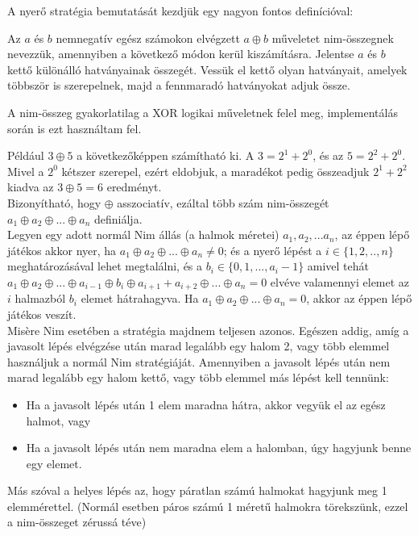A nyerő stratégia bemutatását kezdjük egy nagyon fontos definícióval:
\begin{definition}
	Az $a$ és $b$ nemnegatív egész számokon elvégzett $a \oplus b$ műveletet nim-összegnek nevezzük, amennyiben a következő módon kerül kiszámításra. Jelentse $a$ és $b$ kettő különálló hatványainak összegét. Vessük el kettő olyan hatványait, amelyek többször is szerepelnek, majd a fennmaradó hatványokat adjuk össze.
\end{definition}

\begin{remark}
	A nim-összeg gyakorlatilag a XOR logikai műveletnek felel meg, implementálás során is ezt használtam fel.
\end{remark}

Például $3 \oplus 5$ a következőképpen számítható ki. A $3 = 2^1 + 2^0$, és az $5 = 2^2 + 2^0$. Mivel a $2^0$ kétszer szerepel, ezért eldobjuk, a maradékot pedig  összeadjuk $2^1 + 2^2$ kiadva az $3 \oplus 5 = 6$ eredményt. \\

Bizonyítható, hogy $\oplus$ asszociatív, ezáltal több szám nim-összegét $a_1 \oplus a_2 \oplus ... \oplus a_n$ definiálja. \\

Legyen egy adott normál Nim állás (a halmok méretei) $a_1, a_2, ... a_n$, az éppen lépő játékos akkor nyer, ha $a_1 \oplus a_2 \oplus ... \oplus a_n \neq 0$; és a nyerő lépést a $i \in \{1, 2, .., n\}$ meghatározásával lehet megtalálni, és a $b_i \in \{0, 1, ..., a_i -1\}$ amivel tehát $a_1 \oplus a_2 \oplus ... \oplus a_{i-1} \oplus b_i \oplus a_{i+1} + a_{i+2} \oplus ... \oplus a_n = 0$ elvéve valamennyi elemet az $i$ halmazból $b_i$ elemet hátrahagyva. Ha $a_1 \oplus a_2 \oplus ... \oplus a_n = 0$, akkor az éppen lépő játékos veszít. \\

Misère Nim esetében a stratégia majdnem teljesen azonos. Egészen addig, amíg a javasolt lépés elvégzése után marad legalább egy halom 2, vagy több elemmel használjuk a normál Nim stratégiáját. Amennyiben a javasolt lépés után nem marad legalább egy halom kettő, vagy több elemmel más lépést kell tennünk:
\begin{itemize}
	\item Ha a javasolt lépés után 1 elem maradna hátra, akkor vegyük el az egész halmot, vagy
	\item Ha a javasolt lépés után nem maradna elem a halomban, úgy hagyjunk benne egy elemet.
\end{itemize}
Más szóval a helyes lépés az, hogy páratlan számú halmokat hagyjunk meg 1 elemmérettel. (Normál esetben páros számú 1 méretű halmokra törekszünk, ezzel a nim-összeget zérussá téve) 


